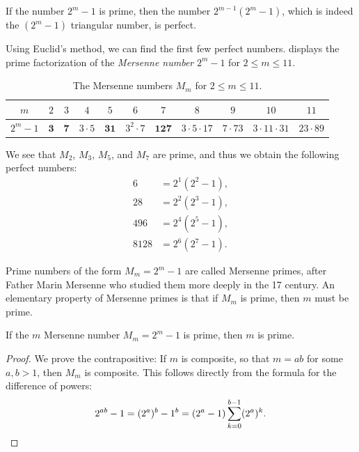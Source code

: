 \begin{proposition}[Euclid]
  If the number $2^m-1$ is prime, then the number $2^{m-1}(2^m-1)$, which is indeed the $(2^m-1)$\supth{} triangular number, is perfect.
\end{proposition}

Using Euclid's method, we can find the first few perfect numbers.  displays the prime factorization of the \emph{Mersenne number} $2^m-1$ for $2\leq m\leq 11$.

\begin{table}[H]
  \centering
  \begin{tabular}{c|cccccccccc}
    $m$ & $2$ & $3$ & $4$ & $5$ & $6$ & $7$ & $8$ & $9$ & $10$ & $11$ \\
    \midrule
    $2^m-1$ & $\symbf{3}$ & $\symbf{7}$ & $3{\cdot} 5$ & $\symbf{31}$ & $3^2{\cdot} 7$ & $\symbf{127}$ & $3{\cdot} 5{\cdot}17$ & $7{\cdot}73$ & $3{\cdot} 11{\cdot} 31$ & $23{\cdot} 89$
  \end{tabular}
  \caption[The first few Mersenne numbers]{The Mersenne numbers $M_m$ for $2\leq m\leq 11$.}
  \label{tab:mersenne-numbers}
\end{table}

We see that $M_2$, $M_3$, $M_5$, and $M_7$ are prime, and thus we obtain the following perfect numbers:
\begin{align*}
  6 & = 2^1(2^2-1), \\
  28 & = 2^2(2^3-1), \\
  496 & = 2^4(2^5-1), \\
  8128 & = 2^6(2^7-1).
\end{align*}

Prime numbers of the form $M_m=2^m-1$ are called Mersenne primes, after Father Marin Mersenne who studied them more deeply in the 17\supth{} century. An elementary property of Mersenne primes is that if $M_m$ is prime, then $m$ must be prime.

\begin{proposition}
  If the $m$\supth{} Mersenne number $M_m=2^m-1$ is prime, then $m$ is prime.
\end{proposition}

\begin{proof}
  We prove the contrapositive: If $m$ is composite, so that $m=ab$ for some $a,b>1$, then $M_m$ is composite. This follows directly from the formula for the difference of powers:
  \begin{equation*}
    2^{ab}-1=(2^a)^b-1^b= (2^a-1)\sum_{k=0}^{b-1} (2^a)^k.\qedhere
  \end{equation*}
\end{proof}

